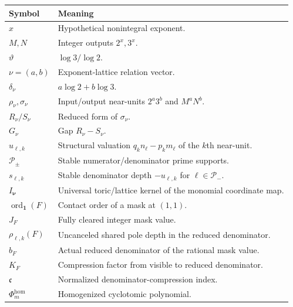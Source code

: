 \documentclass[11pt,oneside]{article}
\theoremstyle{definition}
\theoremstyle{remark}
\newcommand{\ord}{\operatorname{ord}}
\newcommand{\thetaAE}{\vartheta}
\begin{document}
\begin{center}
\small
\begin{tabularx}{\textwidth}{@{}lX@{}}
\toprule
Symbol & Meaning \\
\midrule
$x$ & Hypothetical nonintegral exponent. \\
$M,N$ & Integer outputs $2^x,3^x$. \\
$\thetaAE$ & $\log3/\log2$. \\
$\nu=(a,b)$ & Exponent-lattice relation vector. \\
$\delta_\nu$ & $a\log2+b\log3$. \\
$\rho_\nu,\sigma_\nu$ & Input/output near-units $2^a3^b$ and $M^aN^b$. \\
$R_\nu/S_\nu$ & Reduced form of $\sigma_\nu$. \\
$G_\nu$ & Gap $R_\nu-S_\nu$. \\
$u_{\ell,k}$ & Structural valuation $q_kn_\ell-p_km_\ell$ of the $k$th near-unit. \\
$\mathcal P_\pm$ & Stable numerator/denominator prime supports. \\
$s_{\ell,k}$ & Stable denominator depth $-u_{\ell,k}$ for $\ell\in\mathcal P_-$. \\
$I_{\boldsymbol\nu}$ & Universal toric/lattice kernel of the monomial coordinate map. \\
$\ord_{\mathbf1}(F)$ & Contact order of a mask at $(1,1)$. \\
$J_F$ & Fully cleared integer mask value. \\
$\rho_{\ell,k}(F)$ & Uncanceled shared pole depth in the reduced denominator. \\
$b_F$ & Actual reduced denominator of the rational mask value. \\
$K_F$ & Compression factor from visible to reduced denominator. \\
$\mathfrak c$ & Normalized denominator-compression index. \\
$\Phi_m^{\mathrm{hom}}$ & Homogenized cyclotomic polynomial. \\
\bottomrule
\end{tabularx}
\end{center}
\end{document}
